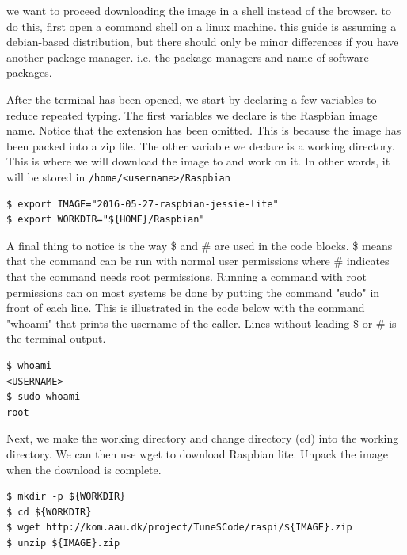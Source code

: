 we want to proceed downloading the image in a shell instead of the browser.
to do this, first open a command shell on a linux machine. this guide is
assuming a debian-based distribution, but there should only be minor differences
if you have another package manager. i.e. the package managers and name of software packages.

After the terminal has been opened, we start by declaring a few variables to reduce
repeated typing. The first variables we declare is the Raspbian image name.
Notice that the extension has been omitted. This is because the image has been
packed into a zip file. The other variable we declare is a working directory.
This is where we will download the image to and work on it. In other words, it
will be stored in \texttt{/home/<username>/Raspbian}


\begin{lstlisting}[]
$ export IMAGE="2016-05-27-raspbian-jessie-lite"
$ export WORKDIR="${HOME}/Raspbian"
\end{lstlisting}
\FloatBarrier
\vspace{-5mm}

A final thing to notice is the way \$ and \# are used in the code blocks. \$
means that the command can be run with normal user permissions where \# indicates that the
command needs root permissions.
Running a command with root permissions can on most systems be done by putting
the command "sudo" in front of each line. This is illustrated in the code below
with the command "whoami" that prints the username of the caller. Lines without
leading \$ or \# is the terminal output.

\begin{lstlisting}[]
$ whoami
<USERNAME>
$ sudo whoami
root
\end{lstlisting}
\FloatBarrier
\vspace{-5mm}

Next, we make the working directory and change directory (cd) into the working
directory. We can then use wget to download Raspbian lite. Unpack the image
when the download is complete.

\begin{lstlisting}[]
$ mkdir -p ${WORKDIR}
$ cd ${WORKDIR}
$ wget http://kom.aau.dk/project/TuneSCode/raspi/${IMAGE}.zip
$ unzip ${IMAGE}.zip
\end{lstlisting}
\FloatBarrier
\vspace{-5mm}

